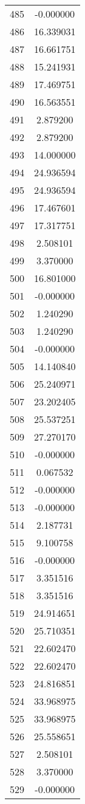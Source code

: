 \documentclass[12pt]{article}
\begin{document}
\begin{longtable}{@{}cc@{}}
485 & -0.000000 \\
486 & 16.339031 \\
487 & 16.661751 \\
488 & 15.241931 \\
489 & 17.469751 \\
490 & 16.563551 \\
491 & 2.879200 \\
492 & 2.879200 \\
493 & 14.000000 \\
494 & 24.936594 \\
495 & 24.936594 \\
496 & 17.467601 \\
497 & 17.317751 \\
498 & 2.508101 \\
499 & 3.370000 \\
500 & 16.801000 \\
501 & -0.000000 \\
502 & 1.240290 \\
503 & 1.240290 \\
504 & -0.000000 \\
505 & 14.140840 \\
506 & 25.240971 \\
507 & 23.202405 \\
508 & 25.537251 \\
509 & 27.270170 \\
510 & -0.000000 \\
511 & 0.067532 \\
512 & -0.000000 \\
513 & -0.000000 \\
514 & 2.187731 \\
515 & 9.100758 \\
516 & -0.000000 \\
517 & 3.351516 \\
518 & 3.351516 \\
519 & 24.914651 \\
520 & 25.710351 \\
521 & 22.602470 \\
522 & 22.602470 \\
523 & 24.816851 \\
524 & 33.968975 \\
525 & 33.968975 \\
526 & 25.558651 \\
527 & 2.508101 \\
528 & 3.370000 \\
529 & -0.000000 \\

\end{longtable}
\end{document}
